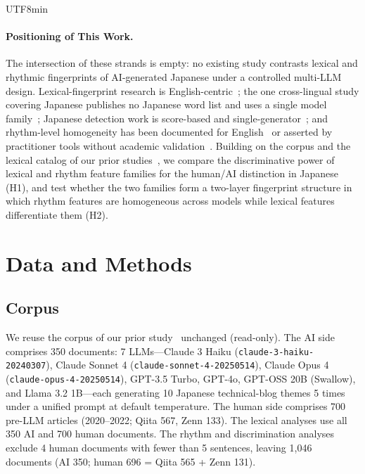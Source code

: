 \documentclass[11pt,a4paper]{article}
\begin{document}
\begin{CJK}{UTF8}{min}
\paragraph{Positioning of This Work.}
The intersection of these strands is empty: no existing study contrasts lexical and rhythmic fingerprints of AI-generated Japanese under a controlled multi-LLM design. Lexical-fingerprint research is English-centric~\citep{kobak2025excess, juzek2025delve, liang2024monitoring}; the one cross-lingual study covering Japanese publishes no Japanese word list and uses a single model family~\citep{juzek2026lexical}; Japanese detection work is score-based and single-generator~\citep{iwata2025jsai}; and rhythm-level homogeneity has been documented for English~\citep{munozortiz2024contrasting, sourati2025shrinking} or asserted by practitioner tools without academic validation~\citep{mizoguchi2026natural}. Building on the corpus and the lexical catalog of our prior studies~\citep{imoto2026excess, imoto2025slop}, we compare the discriminative power of lexical and rhythm feature families for the human/AI distinction in Japanese (H1), and test whether the two families form a two-layer fingerprint structure in which rhythm features are homogeneous across models while lexical features differentiate them (H2).

\section{Data and Methods}

\subsection{Corpus}

We reuse the corpus of our prior study~\citep{imoto2026excess} unchanged (read-only). The AI side comprises 350 documents: 7 LLMs---Claude 3 Haiku (\texttt{claude-3-haiku-20240307}), Claude Sonnet 4 (\texttt{claude-sonnet-4-20250514}), Claude Opus 4 (\texttt{claude-opus-4-20250514}), GPT-3.5 Turbo, GPT-4o, GPT-OSS 20B (Swallow), and Llama 3.2 1B---each generating 10 Japanese technical-blog themes 5 times under a unified prompt at default temperature. The human side comprises 700 pre-LLM articles (2020--2022; Qiita 567, Zenn 133). The lexical analyses use all 350 AI and 700 human documents. The rhythm and discrimination analyses exclude 4 human documents with fewer than 5 sentences, leaving 1{,}046 documents (AI 350; human 696 = Qiita 565 + Zenn 131).


\end{CJK}
\end{document}
